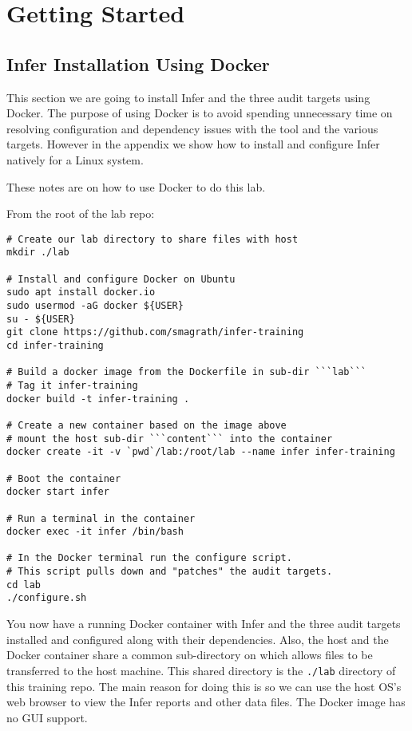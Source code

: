 \section{Getting Started}

\subsection{Infer Installation Using Docker}

This section we are going to install Infer and the three audit targets
using Docker.
The purpose of using Docker is to avoid spending unnecessary time 
on resolving configuration and dependency issues with the tool and 
the various targets.
However in the appendix we show how to install and configure Infer 
natively for a Linux system.

These notes are on how to use Docker to do this lab. 



\noindent From the root of the lab repo: 

\begin{verbatim}
# Create our lab directory to share files with host
mkdir ./lab

# Install and configure Docker on Ubuntu
sudo apt install docker.io
sudo usermod -aG docker ${USER}
su - ${USER}
git clone https://github.com/smagrath/infer-training
cd infer-training

# Build a docker image from the Dockerfile in sub-dir ```lab```
# Tag it infer-training 
docker build -t infer-training .

# Create a new container based on the image above 
# mount the host sub-dir ```content``` into the container 
docker create -it -v `pwd`/lab:/root/lab --name infer infer-training

# Boot the container
docker start infer

# Run a terminal in the container
docker exec -it infer /bin/bash

# In the Docker terminal run the configure script.
# This script pulls down and "patches" the audit targets.
cd lab
./configure.sh
\end{verbatim}

You now have a running Docker container with Infer and the three audit targets
installed and configured along with their dependencies. 
Also, the host and the Docker container share a common sub-directory on
which allows files to be transferred to the host machine.
This shared directory is the \verb|./lab| directory of this training repo. 
The main reason for doing this is so we can use the host OS's web browser
to view the Infer reports and other data files.
The Docker image has no GUI support.

